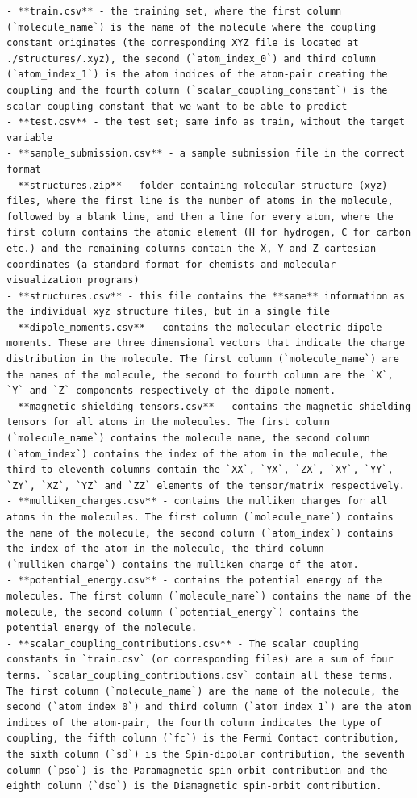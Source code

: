 \documentclass{article} %
\begin{document}
\begin{tcolorbox}[colback=lightgray!10, colframe=black, width=\textwidth, arc=2mm, boxrule=0.5mm, title=The obfuscated description for champs-scalar-coupling, breakable]
\begin{lstlisting}[basicstyle=\tiny\ttfamily, breaklines=true]
- **train.csv** - the training set, where the first column (`molecule_name`) is the name of the molecule where the coupling constant originates (the corresponding XYZ file is located at ./structures/.xyz), the second (`atom_index_0`) and third column (`atom_index_1`) is the atom indices of the atom-pair creating the coupling and the fourth column (`scalar_coupling_constant`) is the scalar coupling constant that we want to be able to predict
- **test.csv** - the test set; same info as train, without the target variable
- **sample_submission.csv** - a sample submission file in the correct format
- **structures.zip** - folder containing molecular structure (xyz) files, where the first line is the number of atoms in the molecule, followed by a blank line, and then a line for every atom, where the first column contains the atomic element (H for hydrogen, C for carbon etc.) and the remaining columns contain the X, Y and Z cartesian coordinates (a standard format for chemists and molecular visualization programs)
- **structures.csv** - this file contains the **same** information as the individual xyz structure files, but in a single file
- **dipole_moments.csv** - contains the molecular electric dipole moments. These are three dimensional vectors that indicate the charge distribution in the molecule. The first column (`molecule_name`) are the names of the molecule, the second to fourth column are the `X`, `Y` and `Z` components respectively of the dipole moment.
- **magnetic_shielding_tensors.csv** - contains the magnetic shielding tensors for all atoms in the molecules. The first column (`molecule_name`) contains the molecule name, the second column (`atom_index`) contains the index of the atom in the molecule, the third to eleventh columns contain the `XX`, `YX`, `ZX`, `XY`, `YY`, `ZY`, `XZ`, `YZ` and `ZZ` elements of the tensor/matrix respectively.
- **mulliken_charges.csv** - contains the mulliken charges for all atoms in the molecules. The first column (`molecule_name`) contains the name of the molecule, the second column (`atom_index`) contains the index of the atom in the molecule, the third column (`mulliken_charge`) contains the mulliken charge of the atom.
- **potential_energy.csv** - contains the potential energy of the molecules. The first column (`molecule_name`) contains the name of the molecule, the second column (`potential_energy`) contains the potential energy of the molecule.
- **scalar_coupling_contributions.csv** - The scalar coupling constants in `train.csv` (or corresponding files) are a sum of four terms. `scalar_coupling_contributions.csv` contain all these terms. The first column (`molecule_name`) are the name of the molecule, the second (`atom_index_0`) and third column (`atom_index_1`) are the atom indices of the atom-pair, the fourth column indicates the type of coupling, the fifth column (`fc`) is the Fermi Contact contribution, the sixth column (`sd`) is the Spin-dipolar contribution, the seventh column (`pso`) is the Paramagnetic spin-orbit contribution and the eighth column (`dso`) is the Diamagnetic spin-orbit contribution.

\end{lstlisting}
\end{tcolorbox}
\end{document}
